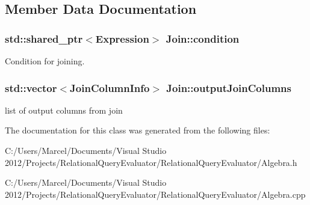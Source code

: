 \subsection{Member Data Documentation}
\hypertarget{class_join_aa1374c434547d1a0a478a914ac0445bb}{
\subsubsection[{condition}]{\setlength{\rightskip}{0pt plus 5cm}std\+::shared\+\_\+ptr$<${\bf Expression}$>$ Join\+::condition}}\label{class_join_aa1374c434547d1a0a478a914ac0445bb}
Condition for joining. \hypertarget{class_join_ad0fbf6166d055f84e2a1e9ec5af9824a}{
\subsubsection[{output\+Join\+Columns}]{\setlength{\rightskip}{0pt plus 5cm}std\+::vector$<${\bf Join\+Column\+Info}$>$ Join\+::output\+Join\+Columns}}\label{class_join_ad0fbf6166d055f84e2a1e9ec5af9824a}
list of output columns from join 

The documentation for this class was generated from the following files\+:\begin{DoxyCompactItemize}
\item 
C\+:/\+Users/\+Marcel/\+Documents/\+Visual Studio 2012/\+Projects/\+Relational\+Query\+Evaluator/\+Relational\+Query\+Evaluator/Algebra.\+h\item 
C\+:/\+Users/\+Marcel/\+Documents/\+Visual Studio 2012/\+Projects/\+Relational\+Query\+Evaluator/\+Relational\+Query\+Evaluator/Algebra.\+cpp\end{DoxyCompactItemize}
